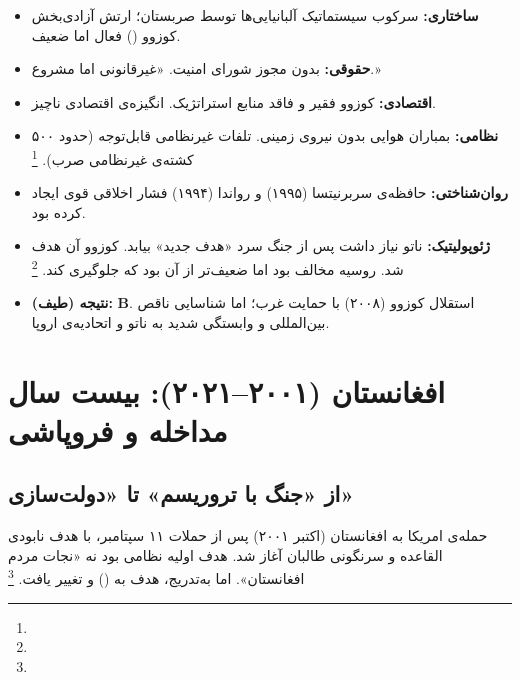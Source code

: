 \begin{tcolorbox}[casebox, title={تحلیل شش‌وجهی: کوزوو (۱۹۹۹)}]
\begin{itemize}[nosep, rightmargin=1em]
  \item \textbf{ساختاری:} سرکوب سیستماتیک آلبانیایی‌ها توسط صربستان؛ ارتش آزادی‌بخش کوزوو () فعال اما ضعیف.
  \item \textbf{حقوقی:} بدون مجوز شورای امنیت. «غیرقانونی اما مشروع.»
  \item \textbf{اقتصادی:} کوزوو فقیر و فاقد منابع استراتژیک. انگیزه‌ی اقتصادی ناچیز.
  \item \textbf{نظامی:} بمباران هوایی بدون نیروی زمینی. تلفات غیرنظامی قابل‌توجه (حدود ۵۰۰ کشته‌ی غیرنظامی صرب).%
  \footnote{}
  \item \textbf{روان‌شناختی:} حافظه‌ی سربرنیتسا (۱۹۹۵) و رواندا (۱۹۹۴) فشار اخلاقی قوی ایجاد کرده بود.
  \item \textbf{ژئوپولیتیک:} ناتو نیاز داشت پس از جنگ سرد «هدف جدید» بیابد. کوزوو آن هدف شد. روسیه مخالف بود اما ضعیف‌تر از آن بود که جلوگیری کند.%
  \footnote{}
  \item \textbf{نتیجه (طیف):} \textbf{B}. استقلال کوزوو (۲۰۰۸) با حمایت غرب؛ اما شناسایی ناقص بین‌المللی و وابستگی شدید به ناتو و اتحادیه‌ی اروپا.
\end{itemize}
\end{tcolorbox}

\section{افغانستان (۲۰۰۱–۲۰۲۱): بیست سال مداخله و فروپاشی}
\label{sec:ch10-afghanistan}

\subsection{از «جنگ با تروریسم» تا «دولت‌سازی»}

حمله‌ی امریکا به افغانستان (اکتبر ۲۰۰۱) پس از حملات ۱۱ سپتامبر، با هدف نابودی القاعده و سرنگونی طالبان آغاز شد. هدف اولیه نظامی بود نه «نجات مردم افغانستان». اما به‌تدریج، هدف به  () و  تغییر یافت.%
\footnote{}


